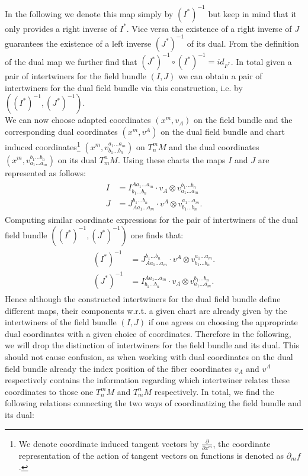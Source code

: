 \documentclass[a4paper,12pt, DIV=14, BCOR=5mm, twoside, headsepline, numbers=noenddot]{scrbook}
\begin{document}
In the following we denote this map simply by $(I^{\ast})^{-1}$ but keep in mind that it only provides a right inverse of $I^{\ast}$. Vice versa the existence of a right inverse of $J$ guarantees the existence of a left inverse $(J^{\ast})^{-1}$ of its dual. From the definition of the dual map we further find that $(J^{\ast})^{-1} \circ (I^{\ast})^{-1} = id_{F^{\ast}}$. In total given a pair of intertwiners for the field bundle $(I,J)$ we can obtain a pair of intertwiners for the dual field bundle via this construction, i.e. by $((I^{\ast})^{-1}, (J^{\ast})^{-1})$. \\

We can now choose adapted coordinates $(x^m,v_A)$ on the field bundle and the corresponding dual coordinates $(x^m, v^A)$ on the dual field bundle and chart induced coordinates\footnote{We denote coordinate induced tangent vectors by $\frac{\partial}{\partial x^m}$, the coordinate representation of the action of tangent vectors on functions is denoted as $\partial_m f$. } $(x^m, v^{a_1 ... a_m}_{b_1 ... b_n})$ on $T^m_n M$ and the dual coordinates $(x^m, v^{b_1 ... b_n}_{a_1 ... a_m})$ on its dual $T^n_mM$. Using these charts the maps $I$ and $J$ are represented as follows:
\begin{align} \label{interAbs}
    \begin{aligned}
    I &= I^{A a_1 ... a_m}_{b_1 ... b_n} \cdot v_A \otimes  v^{b_1 ... b_n}_{a_1 ... a_m}\\
    J &= J^{b_1 ... b_n}_{A a_1 ... a_m} \cdot v^A \otimes  v^{a_1 ... a_m}_{b_1 ... b_n}.
    \end{aligned}
\end{align}
Computing similar coordinate expressions for the pair of intertwiners of the dual field bundle $((I^{\ast})^{-1}, (J^{\ast})^{-1})$ one finds that:
\begin{align} \label{dualInterAbs}
    \begin{aligned}
         (I^{\ast})^{-1} &= J^{b_1 ... b_n}_{A a_1 ... a_m} \cdot v^A \otimes  v^{a_1 ... a_m}_{b_1 ... b_n}.\\
         (J^{\ast})^{-1} &= I^{A a_1 ... a_m}_{b_1 ... b_n} \cdot v_A \otimes  v^{b_1 ... b_n}_{a_1 ... a_m}.
    \end{aligned}
\end{align} 
Hence although the constructed intertwiners for the dual field bundle define different maps, their components w.r.t. a given chart are already given by the intertwiners of the field bundle $(I,J)$ if one agrees on choosing the appropriate dual coordinates with a given choice of coordinates. Therefore in the following, we will drop the distinction of intertwiners for the field bundle and its dual.  This should not cause confusion, as when working with dual coordinates on the dual field bundle already the index position of the fiber coordinates $v_A$ and $v^{A}$ respectively contains the information regarding which intertwiner relates these coordinates to those one $T^m_n M$ and $T^n_mM$ respectively. In total, we find the following relations connecting the two ways of coordinatizing the field bundle and its dual: 
\end{document}
